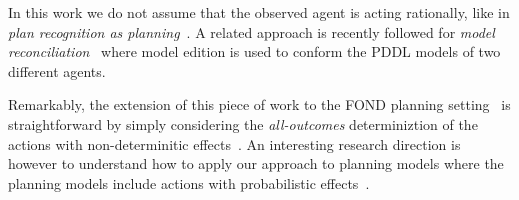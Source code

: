 \documentclass[letterpaper]{article} %
\begin{document}
In this work we do not assume that the observed agent is acting rationally, like in {\em plan recognition as planning}~\cite{ramirez2012plan,ramirez2009plan}. A related approach is recently followed for {\em model reconciliation}~\cite{Kambhampati:mreconciliation:ijcai17} where model edition is used to conform the PDDL models of two different agents.

Remarkably, the extension of this piece of work to the FOND planning setting~\cite{muise2012improved} is straightforward by simply considering the {\em all-outcomes} determiniztion of the actions with non-determinitic effects~\cite{yoon2007ff}. An interesting research direction is however to understand how to apply our approach to planning models where the planning models include actions with probabilistic effects~\cite{younes2005first}.  



\end{document}
